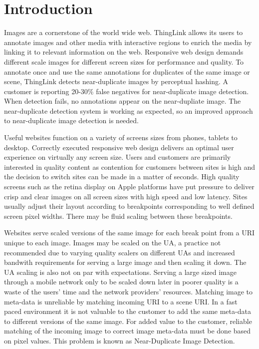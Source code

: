 \documentclass[english,12pt,a4paper,pdftex,elec,utf8, table]{aaltothesis}
\begin{document}
\section{Introduction}

\thispagestyle{empty}

Images are a cornerstone of the world wide web. ThingLink allows its users to annotate images and other media with interactive regions to enrich the media by linking it to relevant information on the web. Responsive web design demands different scale images for different screen sizes for performance and quality. To annotate once and use the same annotations for duplicates of the same image or scene, ThingLink detects near-duplicate images by perceptual hashing. A customer is reporting 20-30\% false negatives for near-duplicate image detection. When detection fails, no annotations appear on the near-dupliate image. The near-duplicate detection system is working as expected, so an improved approach to near-duplicate image detection is needed.

Useful websites function on a variety of screens sizes from phones, tablets to desktop. Correctly executed responsive web design delivers an optimal user experience on virtually any screen size. Users and customers are primarily interested in quality content as contention for customers between sites is high and the decision to switch sites can be made in a matter of seconds. High quality screens such as the retina display on Apple platforms have put pressure to deliver crisp and clear images on all screen sizes with high speed and low latency. Sites usually adjust their layout according to breakpoints corresponding to well defined screen pixel widths. There may be fluid scaling between these breakpoints.

Websites serve scaled versions of the same image for each break point from a URI unique to each image. Images may be scaled on the UA, a practice not recommended due to varying quality scalers on different UAs and increased bandwith requirements for serving a large image and then scaling it down. The UA scaling is also not on par with expectations. Serving a large sized image through a mobile network only to be scaled down later in poorer quality is a waste of the users' time and the network providers' resources. Matching image to meta-data is unreliable by matching incoming URI to a scene URI. In a fast paced environment it is not valuable to the customer to add the same meta-data to different versions of the same image. For added value to the customer, reliable matching of the incoming image to correct image meta-data must be done based on pixel values. This problem is known as Near-Duplicate Image Detection.
\end{document}
